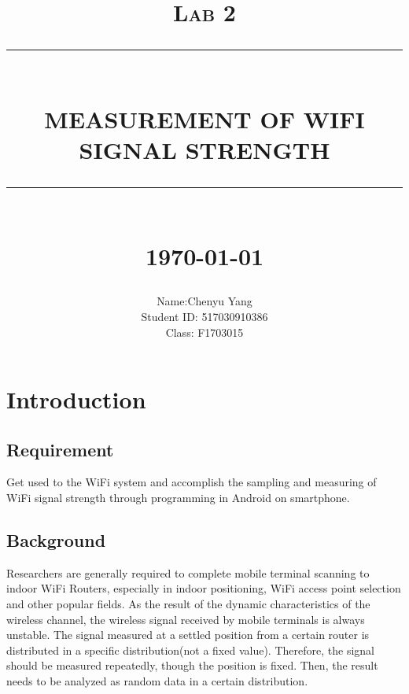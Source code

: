 \documentclass[12pt]{report}
\newcommand{\HRule}[1]{\rule{\linewidth}{#1}}
\begin{document}
\title{ \normalsize \textsc{Lab 2}
        \\ [2.0cm]
        \HRule{0.5pt} \\
        \LARGE \textbf{\uppercase{Measurement of wifi signal strength}}
        \HRule{2pt} \\ [0.5cm]
        \normalsize \today \vspace*{5\baselineskip}}

\date{}

\author{
        Name:Chenyu Yang \\
        Student ID: 517030910386 \\ 
        Class: F1703015 }

\maketitle
\tableofcontents
\newpage

\sectionfont{\scshape}


\section{Introduction}
\subsection{Requirement}
Get used to the WiFi system and accomplish the sampling and measuring of WiFi signal strength through programming in Android on smartphone.

\subsection{Background}
Researchers are generally required to complete mobile terminal scanning to indoor WiFi Routers, especially in indoor positioning, WiFi access point selection and other popular fields. As the result of the dynamic characteristics of the wireless channel, the wireless signal received by mobile terminals is always unstable. The signal measured at a settled position from a certain router is distributed in a specific distribution(not a fixed value). Therefore, the signal should be measured repeatedly, though the position is fixed. Then, the result needs to be analyzed as random data in a certain distribution. 
\end{document}
